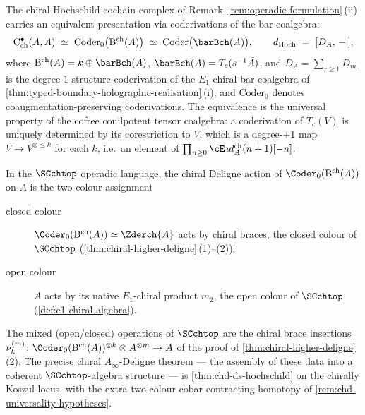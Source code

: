 \begin{remark}
\label{rem:bar-coder-SCchtop-colour-assignment}
%
%
The chiral Hochschild cochain complex of
\textup{Remark~\ref{rem:operadic-formulation}\,(ii)} carries an
equivalent presentation via coderivations of the bar coalgebra:
\begin{equation}\label{eq:bar-coder-iso}
 \mathrm{C}^{\bullet}_{\mathrm{ch}}(A, A)
 \;\simeq\;
 \mathrm{Coder}_0\bigl(\mathrm B^{\mathrm{ch}}(A)\bigr)
 \;\simeq\;
 \mathrm{Coder}\bigl(\barBch(A)\bigr),
 \qquad
 d_{\mathrm{Hoch}} \;=\; [D_A,\, -\,],
\end{equation}
where $\mathrm B^{\mathrm{ch}}(A)=k\oplus\barBch(A)$,
\(\barBch(A)=T_{c}(s^{-1}\bar A)\), and
\(D_A=\sum_{r\ge1}D_{m_r}\) is the degree-\(1\) structure
coderivation of the
$E_{1}$-chiral bar coalgebra of
\cref{thm:typed-boundary-holographic-realisation}\,(i), and
\(\mathrm{Coder}_0\) denotes coaugmentation-preserving coderivations.
The equivalence is the universal property of the cofree conilpotent tensor coalgebra:
a coderivation of $T_{c}(V)$ is uniquely determined by its corestriction
to $V$, which is a degree-$+1$ map $V \to V^{\otimes \le k}$ for each
$k$, i.e.\ an element of
$\prod_{n \ge 0} \cE\!nd^{\mathrm{ch}}_{A}(n + 1)[-n]$.

In the $\SCchtop$ operadic language, the chiral Deligne action of
\(\Coder_0(\mathrm B^{\mathrm{ch}}(A))\) on \(A\) is the two-colour assignment
\begin{description}
\item[\textup{closed colour}] \(\Coder_0(\mathrm B^{\mathrm{ch}}(A)) \simeq
\Zderch{A}\) acts by chiral braces, the closed colour of $\SCchtop$
(\cref{thm:chiral-higher-deligne}\,(1)--(2));
\item[\textup{open colour}] $A$ acts by its native $E_{1}$-chiral
product $m_{2}$, the open colour of $\SCchtop$
(\cref{def:e1-chiral-algebra}).
\end{description}
The mixed (open/closed) operations of $\SCchtop$ are the chiral
brace insertions \(\nu^{(m)}_{k} \colon
\Coder_0(\mathrm B^{\mathrm{ch}}(A))^{\otimes k} \otimes A^{\otimes m} \to A\)
of the proof of \cref{thm:chiral-higher-deligne}\,(2).  The precise
chiral $A_{\infty}$-Deligne theorem --- the assembly of these data
into a coherent $\SCchtop$-algebra structure --- is
\cref{thm:chd-ds-hochschild} on the chirally Koszul locus, with the
extra two-colour cobar contracting homotopy of
\cref{rem:chd-universality-hypotheses}.
\end{remark}


